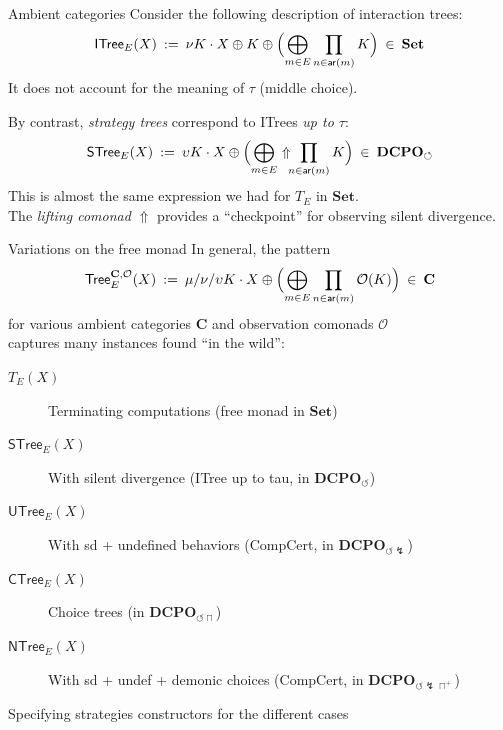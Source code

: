 \documentclass[aspectratio=1610,mathserif]{beamer}
\newcommand\divtok{{\circlearrowleft}}
\begin{document}
\begin{frame}{Ambient categories}
  Consider the following description of interaction trees:
  \[
    \mathsf{ITree}_E(X) \: := \:
      \nu K \cdot X \oplus K \oplus \Bigl(
           \bigoplus_{m \in E} \prod_{n \in \mathsf{ar}(m)} K
         \Bigr) \: \in \: \mathbf{Set}
  \]
  It does not account for the meaning of $\tau$ (middle choice).

  \pause
  \vspace{1em}
  By contrast, \emph{strategy trees} correspond to ITrees
  \emph{up to $\tau$}:
  \[
    \mathsf{STree}_E(X) \: := \:
      \upsilon K \cdot X \oplus \Bigl(
           \bigoplus_{m \in E}
           \, {\Uparrow} \!\!
           \prod_{n \in \mathsf{ar}(m)}
           K
         \Bigr) \: \in \: \mathbf{DCPO}_\divtok
  \]
  This is almost the same expression we had for $T_E$ in $\mathbf{Set}$. \\
  The \emph{lifting comonad} $\Uparrow$ provides a ``checkpoint''
  for observing silent divergence.
\end{frame}

\begin{frame}{Variations on the free monad}
  In general, the pattern
  \[
    \mathsf{Tree}^{\mathbf{C},\mathcal{O}}_E(X) \: := \:
      \mu/\nu/\upsilon K \cdot X \oplus \Bigl(
           \bigoplus_{m \in E} \prod_{n \in \mathsf{ar}(m)}
	     \mathcal{O} (K)
         \Bigr) \: \in \: \mathbf{C}
  \]
  for various ambient categories $\mathbf{C}$ and observation comonads $\mathcal{O}$ \\
  captures many instances found ``in the wild'':
  \begin{description}
    \item[$T_E(X)$] Terminating computations (free monad in $\mathbf{Set}$)
    \item[$\mathsf{STree}_E(X)$]
      With silent divergence (ITree up to tau, in $\mathbf{DCPO}_\divtok$)
    \item[$\mathsf{UTree}_E(X)$]
      With sd + undefined behaviors (CompCert, in $\mathbf{DCPO}_{\divtok\lightning}$)
    \item[$\mathsf{CTree}_E(X)$]
      Choice trees (in $\mathbf{DCPO}_{\divtok\sqcap}$)
    \item[$\mathsf{NTree}_E(X)$]
      With sd + undef + demonic choices
      (CompCert, in $\mathbf{DCPO}_{\divtok\lightning\sqcap^+}$)
  \end{description}
\end{frame}

\begin{frame}{Specifying strategies}
  constructors for the different cases
\end{frame}
\end{document}
